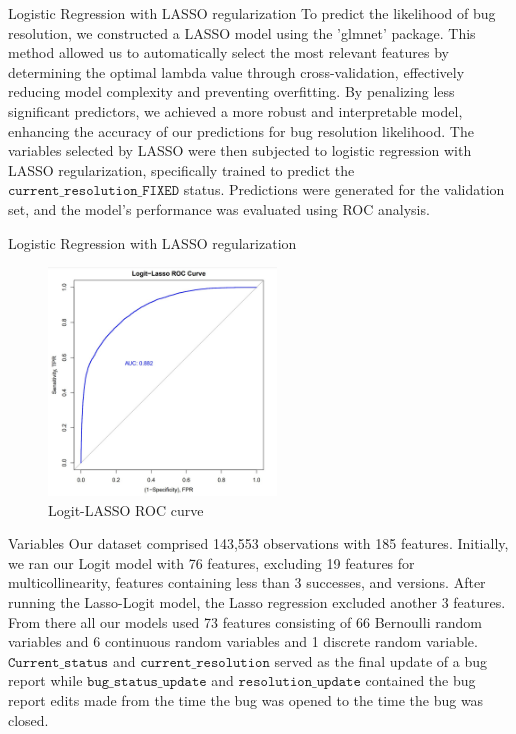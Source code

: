 \documentclass[10pt]{beamer}
\begin{document}
\begin{frame}[t]{Logistic Regression with LASSO regularization} \justifying \vspace{10pt}
	To predict the likelihood of bug resolution, we constructed a LASSO model using the 'glmnet' package. This method allowed us to automatically select the most relevant features by determining the optimal lambda value through cross-validation, effectively reducing model complexity and preventing overfitting. By penalizing less significant predictors, we achieved a more robust and interpretable model, enhancing the accuracy of our predictions for bug resolution likelihood.
	\vskip 16pt 
	The variables selected by LASSO were then subjected to logistic regression with LASSO regularization, specifically trained to predict the $\texttt{current\_resolution\_FIXED}$ status. Predictions were generated for the validation set, and the model's performance was evaluated using ROC analysis.
\end{frame}


\begin{frame}[t]{Logistic Regression with LASSO regularization}\justifying \vspace{1pt}
	\begin{figure}[htp]
		\centering
		\includegraphics[width=0.54\textwidth]{./Logit-Lasso_ROC.jpg}
		\caption{Logit-LASSO ROC curve}
		\label{fig:picture1}
	\end{figure}
\end{frame}


\begin{frame}[t]{Variables} \justifying \vspace{25pt}
	Our dataset comprised 143,553 observations with 185 features. Initially, we ran our Logit model with 76 features, excluding 19 features for multicollinearity, features containing less than 3 successes, and versions. After running the Lasso-Logit model, the Lasso regression excluded another 3 features. From there  all our models used 73 features consisting of 66 Bernoulli random variables and 6 continuous random variables and 1 discrete random variable. 
	$\texttt{Current\_status}$ and $\texttt{current\_resolution}$ served as the final update of a bug report while $\texttt{bug\_status\_update}$ and $\texttt{resolution\_update}$ contained the bug report edits made from the time the bug was opened to the time the bug was closed. 
\end{frame}
\end{document}
